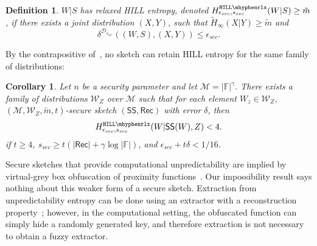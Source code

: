 \documentclass[11pt]{article}
\newtheorem{corollary}[theorem]{Corollary}
\newtheorem{definition}[theorem]{Definition}
\newcommand{\defref}[1]{\mbox{Definition~\ref{#1}}}
\newcommand{\class}[1]{{\ensuremath{\mathsf{#1}}}}
\newcommand{\sketch}{\ensuremath{\class{SS}}\xspace}
\newcommand{\rec}{\ensuremath{\class{Rec}}\xspace}
\newcommand{\hillrlx}{\ensuremath{\mathtt{HILL\mhyphen rlx}}\xspace}
\begin{document}
\begin{definition}
\label{def:relaxed hill}
$W|S$ has \emph{relaxed HILL entropy},
denoted $H^{\hillrlx}_{\epsilon_{sec}, s_{sec}}(W|S)\geq \tilde{m}$, if there exists a joint distribution $(X, Y)$, such that $\tilde{H}_\infty(X|Y)\geq \tilde{m}$ and \[\delta^{\mathcal{D}_{s_{sec}}} ((W, S),(X,Y))\leq \epsilon_{sec}.\]
\end{definition}

\noindent
By the contrapositive of~\cite[Corollary 3.8]{fuller2013computational}, no sketch can retain HILL entropy for the same family of distributions:

\begin{corollary}
\label{cor:imposs comp sketch}
Let $n$ be a security parameter and let $\mathcal{M} = |\mathbb{F}|^\gamma$.  There exists a family of distributions $\mathcal{W}_Z$ over $\mathcal{M}$ such that for each element $W_z\in \mathcal{W}_Z$, $(\mathcal{M}, \mathcal{W}_Z, \tilde{m}, t)$-secure sketch $(\sketch, \rec)$ with error $\delta$, then \[H^{\hillrlx}_{\epsilon_{sec}, s_{sec}}(W | \sketch(W), Z)<4.\]
if 
$t \ge 4$, $s_{sec}\ge t(|\rec| + \gamma \log |\mathbb{F}|)$, and  $\epsilon_{sec} + t\delta < 1/16$.
\end{corollary}



\noindent
Secure sketches that provide computational unpredictability are implied by virtual-grey box obfuscation of proximity functions~\cite{BitanskyCKP14}.  Our impossibility result says nothing about this weaker form of a secure sketch.  Extraction from unpredictability entropy can be done using an extractor with a reconstruction property~\cite{barak-computational,DBLP:conf/eurocrypt/HsiaoLR07}; however, in the computational setting, the obfuscated function can simply hide a randomly generated key, and therefore extraction is not necessary to obtain a fuzzy extractor.
\end{document}
